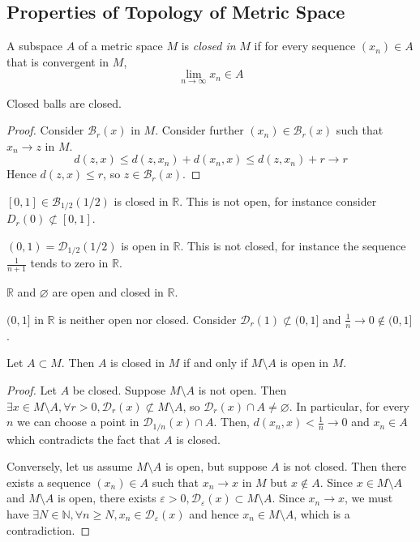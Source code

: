 \subsection{Properties of Topology of Metric Space}
\begin{definition}
    A subspace \( A \) of a metric space \( M \) is \textit{closed in} \( M \) if for every sequence \( (x_n) \in A \) that is convergent in \( M \),
    \[ \lim_{n \to \infty} x_n \in A \]
\end{definition}
\begin{lemma}
    Closed balls are closed.
\end{lemma}
\begin{proof}
    Consider \( \mathcal B_r(x) \) in \( M \).
    Consider further \( (x_n) \in \mathcal B_r(x) \) such that \( x_n \to z \) in \( M \).
    \[ d(z,x) \leq d(z,x_n) + d(x_n,x) \leq d(z,x_n) + r \to r \]
    Hence \( d(z,x) \leq r \), so \( z \in \mathcal B_r(x) \).
\end{proof}
\begin{example}
    \( [0,1] \in \mathcal B_{1/2}(1/2) \) is closed in \( \mathbb R \).
    This is not open, for instance consider \( D_r(0) \not\subset [0,1] \).
\end{example}
\begin{example}
    \( (0,1) = \mathcal D_{1/2}(1/2) \) is open in \( \mathbb R \).
    This is not closed, for instance the sequence \( \frac{1}{n+1} \) tends to zero in \( \mathbb R \).
\end{example}
\begin{example}
    \( \mathbb R \) and \( \varnothing \) are open and closed in \( \mathbb R \).
\end{example}
\begin{example}
    \( (0,1] \) in \( \mathbb R \) is neither open nor closed.
    Consider \( \mathcal D_r(1) \not\subset (0,1] \) and \( \frac{1}{n} \to 0 \not\in (0,1] \).
\end{example}
\begin{lemma}
    Let \( A \subset M \).
    Then \( A \) is closed in \( M \) if and only if \( M \setminus A \) is open in \( M \).
\end{lemma}
\begin{proof}
    Let \( A \) be closed.
    Suppose \( M \setminus A \) is not open.
    Then \( \exists x \in M \setminus A, \forall r > 0, \mathcal D_r(x) \not\subset M \setminus A \), so \( \mathcal D_r(x) \cap A \neq \varnothing \).
    In particular, for every \( n \) we can choose a point in \( \mathcal D_{1/n}(x) \cap A \).
    Then, \( d(x_n,x) < \frac{1}{n} \to 0 \) and \( x_n \in A \) which contradicts the fact that \( A \) is closed.

    Conversely, let us assume \( M \setminus A \) is open, but suppose \( A \) is not closed.
    Then there exists a sequence \( (x_n) \in A \) such that \( x_n \to x \) in \( M \) but \( x \not\in A \).
    Since \( x \in M \setminus A \) and \( M \setminus A \) is open, there exists \( \varepsilon > 0, \mathcal D_\varepsilon(x) \subset M \setminus A \).
    Since \( x_n \to x \), we must have \( \exists N \in \mathbb N, \forall n \geq N, x_n \in \mathcal D_\varepsilon(x) \) and hence \( x_n \in M \setminus A \), which is a contradiction.
\end{proof}

